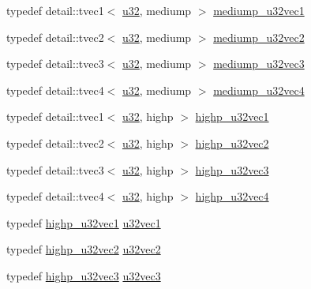 \begin{CompactItemize}
\item 
typedef detail::tvec1$<$ \hyperlink{group__gtc__type__precision_g54e837745059fd29017bed71cfa0a8db}{u32}, mediump $>$ \hyperlink{group__gtc__type__precision_g323fb0ed8f492d918b087226db2994f3}{mediump\_\-u32vec1}
\item 
typedef detail::tvec2$<$ \hyperlink{group__gtc__type__precision_g54e837745059fd29017bed71cfa0a8db}{u32}, mediump $>$ \hyperlink{group__gtc__type__precision_g5d16ea7e110d8ba923ca347c16704f88}{mediump\_\-u32vec2}
\item 
typedef detail::tvec3$<$ \hyperlink{group__gtc__type__precision_g54e837745059fd29017bed71cfa0a8db}{u32}, mediump $>$ \hyperlink{group__gtc__type__precision_g84a903ce8834b22f78d80a64eb0181bb}{mediump\_\-u32vec3}
\item 
typedef detail::tvec4$<$ \hyperlink{group__gtc__type__precision_g54e837745059fd29017bed71cfa0a8db}{u32}, mediump $>$ \hyperlink{group__gtc__type__precision_g532f59ac4c36a7e1371341165f7be33b}{mediump\_\-u32vec4}
\item 
typedef detail::tvec1$<$ \hyperlink{group__gtc__type__precision_g54e837745059fd29017bed71cfa0a8db}{u32}, highp $>$ \hyperlink{group__gtc__type__precision_g8a92d1f79e2fd4a03be803e35aac8e1b}{highp\_\-u32vec1}
\item 
typedef detail::tvec2$<$ \hyperlink{group__gtc__type__precision_g54e837745059fd29017bed71cfa0a8db}{u32}, highp $>$ \hyperlink{group__gtc__type__precision_gddb81e8e12bd640e188744ed372c95bb}{highp\_\-u32vec2}
\item 
typedef detail::tvec3$<$ \hyperlink{group__gtc__type__precision_g54e837745059fd29017bed71cfa0a8db}{u32}, highp $>$ \hyperlink{group__gtc__type__precision_gb1e386f5e415e00f800edf5d15207286}{highp\_\-u32vec3}
\item 
typedef detail::tvec4$<$ \hyperlink{group__gtc__type__precision_g54e837745059fd29017bed71cfa0a8db}{u32}, highp $>$ \hyperlink{group__gtc__type__precision_g9418a8d549d344d4f7b7158771a2fdfe}{highp\_\-u32vec4}
\item 
typedef \hyperlink{group__gtc__type__precision_g8a92d1f79e2fd4a03be803e35aac8e1b}{highp\_\-u32vec1} \hyperlink{group__gtc__type__precision_gc8263c8c0bb36bc5c3d109f508e0fb41}{u32vec1}
\item 
typedef \hyperlink{group__gtc__type__precision_gddb81e8e12bd640e188744ed372c95bb}{highp\_\-u32vec2} \hyperlink{group__gtc__type__precision_ga543e17450ca67dee12e2c41badfb3a7}{u32vec2}
\item 
typedef \hyperlink{group__gtc__type__precision_gb1e386f5e415e00f800edf5d15207286}{highp\_\-u32vec3} \hyperlink{group__gtc__type__precision_g7c88634a005904a441cba739d7cc4055}{u32vec3}

\end{CompactItemize}

